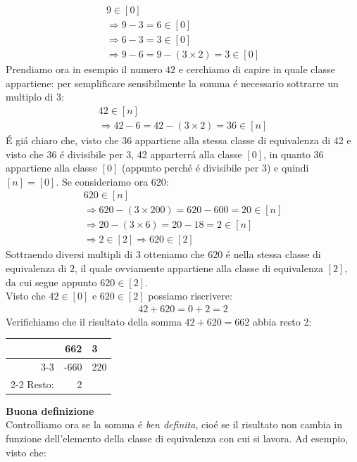 \documentclass[twoside]{article} %
\begin{document}
	\begin{gather*}
	 	9\in [0]\\
	 	\Rightarrow 9-3=6\in [0]\\
	 	\Rightarrow 6-3=3\in [0]\\
	 	\Rightarrow 9-6=9-(3\times 2)=3\in [0]
	 \end{gather*} 
	 Prendiamo ora in esempio il numero $42$ e cerchiamo di capire in quale classe appartiene: per semplificare sensibilmente la somma \'e necessario sottrarre un multiplo di $3$:
	\begin{gather*}
	 	42\in [n]\\
	 	\Rightarrow 42-6=42-(3\times 2)=36\in [n]
	 \end{gather*} 	  
	\newpage	 
	 \noindent \'E gi\'a chiaro che, visto che 36 appartiene alla stessa classe di equivalenza di 42 e visto che 36 \'e divisibile per 3, 42 apparterr\'a alla classe $[0]$, in quanto 36 appartiene alla classe $[0]$ (appunto perch\'e \'e divisibile per 3) e quindi $[n]=[0]$. Se consideriamo ora 620:
	 \begin{gather*}
	 	620\in [n]\\
	 	\Rightarrow 620-(3\times 200)=620-600=20\in [n]\\
	 	\Rightarrow 20-(3\times 6)=20-18=2\in [n]\\
	 	\Rightarrow 2\in [2]\Rightarrow 620\in[2]
	 \end{gather*} 
	 Sottraendo diversi multipli di 3 otteniamo che $620$ \'e nella stessa classe di equivalenza di $2$, il quale ovviamente appartiene alla classe di equivalenza $[2]$, da cui segue appunto $620\in [2]$.\\
	 Visto che $42\in [0]$ e $620\in [2]$ possiamo riscrivere:
	\begin{gather*}
		42+620=0+2=2
	\end{gather*}
	 Verifichiamo che il risultato della somma $42+620=662$ abbia resto 2{\vspace{-10pt}}:\\
	 \begin{center}	
		\begin{tabular}{rr|l}
			&662&3\\ \cline{3-3}
			&-660&220\\ \cline{2-2}
			Resto:&2&
		\end{tabular}
	\end{center}
	{\large \textbf{Buona definizione}}\\
	Controlliamo ora se la somma \'e \textit{ben definita}, cio\'e se il risultato non cambia in funzione dell'elemento della classe di equivalenza con cui si lavora. Ad esempio, visto che:
\end{document}
